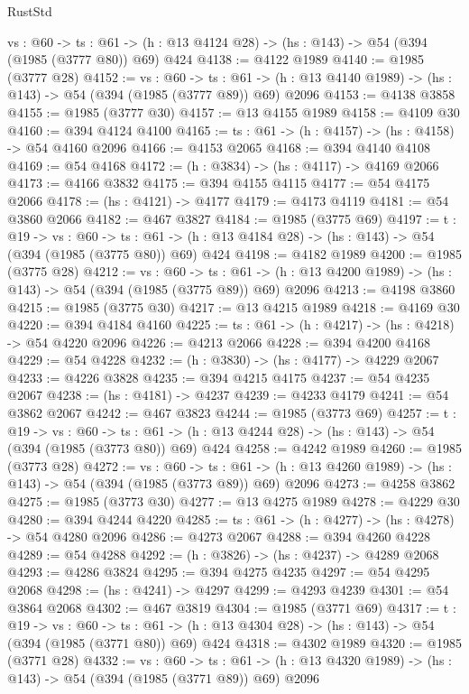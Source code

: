 \begin{lexlean}{RustStd}
\begin{coremodule}
{\begin{coremodule}
{{{{{{{{{{  {vs : @60} ->
  {ts : @61} -> (h : @13 @4124 @28) -> (hs : @143) -> @54 (@394 (@1985 (@3777 @80)) @69) @424
@4138 := @4122 @1989
@4140 := @1985 (@3777 @28)
@4152 := {vs : @60} ->
  {ts : @61} -> (h : @13 @4140 @1989) -> (hs : @143) -> @54 (@394 (@1985 (@3777 @89)) @69) @2096
@4153 := @4138 @3858
@4155 := @1985 (@3777 @30)
@4157 := @13 @4155 @1989
@4158 := @4109 @30
@4160 := @394 @4124 @4100
@4165 := {ts : @61} -> (h : @4157) -> (hs : @4158) -> @54 @4160 @2096
@4166 := @4153 @2065
@4168 := @394 @4140 @4108
@4169 := @54 @4168
@4172 := (h : @3834) -> (hs : @4117) -> @4169 @2066
@4173 := @4166 @3832
@4175 := @394 @4155 @4115
@4177 := @54 @4175 @2066
@4178 := (hs : @4121) -> @4177
@4179 := @4173 @4119
@4181 := @54 @3860 @2066
@4182 := @467 @3827
@4184 := @1985 (@3775 @69)
@4197 := {t : @19} ->
  {vs : @60} ->
  {ts : @61} -> (h : @13 @4184 @28) -> (hs : @143) -> @54 (@394 (@1985 (@3775 @80)) @69) @424
@4198 := @4182 @1989
@4200 := @1985 (@3775 @28)
@4212 := {vs : @60} ->
  {ts : @61} -> (h : @13 @4200 @1989) -> (hs : @143) -> @54 (@394 (@1985 (@3775 @89)) @69) @2096
@4213 := @4198 @3860
@4215 := @1985 (@3775 @30)
@4217 := @13 @4215 @1989
@4218 := @4169 @30
@4220 := @394 @4184 @4160
@4225 := {ts : @61} -> (h : @4217) -> (hs : @4218) -> @54 @4220 @2096
@4226 := @4213 @2066
@4228 := @394 @4200 @4168
@4229 := @54 @4228
@4232 := (h : @3830) -> (hs : @4177) -> @4229 @2067
@4233 := @4226 @3828
@4235 := @394 @4215 @4175
@4237 := @54 @4235 @2067
@4238 := (hs : @4181) -> @4237
@4239 := @4233 @4179
@4241 := @54 @3862 @2067
@4242 := @467 @3823
@4244 := @1985 (@3773 @69)
@4257 := {t : @19} ->
  {vs : @60} ->
  {ts : @61} -> (h : @13 @4244 @28) -> (hs : @143) -> @54 (@394 (@1985 (@3773 @80)) @69) @424
@4258 := @4242 @1989
@4260 := @1985 (@3773 @28)
@4272 := {vs : @60} ->
  {ts : @61} -> (h : @13 @4260 @1989) -> (hs : @143) -> @54 (@394 (@1985 (@3773 @89)) @69) @2096
@4273 := @4258 @3862
@4275 := @1985 (@3773 @30)
@4277 := @13 @4275 @1989
@4278 := @4229 @30
@4280 := @394 @4244 @4220
@4285 := {ts : @61} -> (h : @4277) -> (hs : @4278) -> @54 @4280 @2096
@4286 := @4273 @2067
@4288 := @394 @4260 @4228
@4289 := @54 @4288
@4292 := (h : @3826) -> (hs : @4237) -> @4289 @2068
@4293 := @4286 @3824
@4295 := @394 @4275 @4235
@4297 := @54 @4295 @2068
@4298 := (hs : @4241) -> @4297
@4299 := @4293 @4239
@4301 := @54 @3864 @2068
@4302 := @467 @3819
@4304 := @1985 (@3771 @69)
@4317 := {t : @19} ->
  {vs : @60} ->
  {ts : @61} -> (h : @13 @4304 @28) -> (hs : @143) -> @54 (@394 (@1985 (@3771 @80)) @69) @424
@4318 := @4302 @1989
@4320 := @1985 (@3771 @28)
@4332 := {vs : @60} ->
  {ts : @61} -> (h : @13 @4320 @1989) -> (hs : @143) -> @54 (@394 (@1985 (@3771 @89)) @69) @2096
}}}}}}}}}}
\end{coremodule}}
\end{coremodule}
\end{lexlean}
